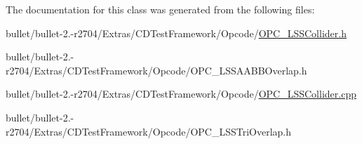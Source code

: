 The documentation for this class was generated from the following files\+:\begin{DoxyCompactItemize}
\item 
bullet/bullet-\/2.-\/r2704/\+Extras/\+C\+D\+Test\+Framework/\+Opcode/\hyperlink{_o_p_c___l_s_s_collider_8h}{O\+P\+C\+\_\+\+L\+S\+S\+Collider.\+h}\item 
bullet/bullet-\/2.-\/r2704/\+Extras/\+C\+D\+Test\+Framework/\+Opcode/O\+P\+C\+\_\+\+L\+S\+S\+A\+A\+B\+B\+Overlap.\+h\item 
bullet/bullet-\/2.-\/r2704/\+Extras/\+C\+D\+Test\+Framework/\+Opcode/\hyperlink{_o_p_c___l_s_s_collider_8cpp}{O\+P\+C\+\_\+\+L\+S\+S\+Collider.\+cpp}\item 
bullet/bullet-\/2.-\/r2704/\+Extras/\+C\+D\+Test\+Framework/\+Opcode/O\+P\+C\+\_\+\+L\+S\+S\+Tri\+Overlap.\+h\end{DoxyCompactItemize}
